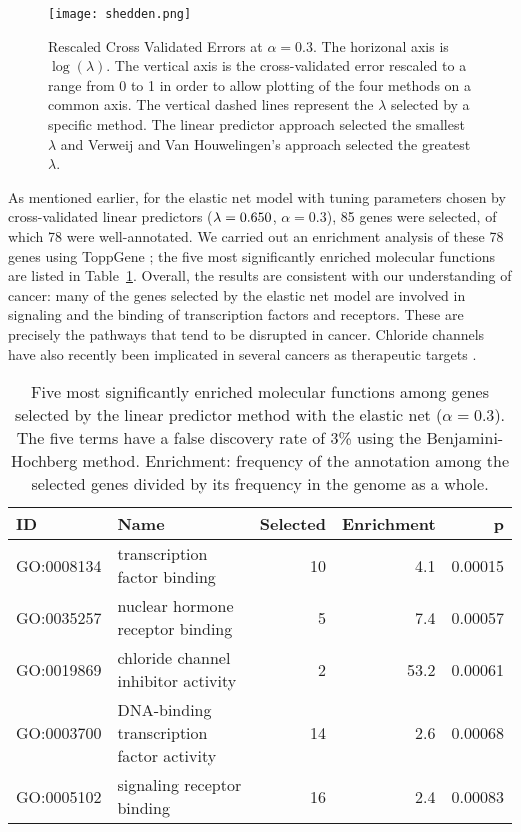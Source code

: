 \begin{figure}[!htb]
  \centering
  \texttt{[image: shedden.png]}
  \caption{\label{fig:CVE}Rescaled Cross Validated Errors at $\alpha = 0.3$. The horizonal axis is $\log(\lambda)$. The vertical axis is the cross-validated error rescaled to a range from 0 to 1 in order to allow plotting of the four methods on a common axis. The vertical dashed lines represent the $\lambda$ selected by a specific method. The linear predictor approach selected the smallest $\lambda$ and Verweij and Van Houwelingen's approach selected the greatest $\lambda$.}
\end{figure}

As mentioned earlier, for the elastic net model with tuning parameters chosen by cross-validated linear predictors ($\lambda = 0.650$, $\alpha = 0.3$), 85 genes were selected, of which 78 were well-annotated.  We carried out an enrichment analysis of these 78 genes using ToppGene \citep{Chen2009c}; the five most significantly enriched molecular functions are listed in Table~\ref{Tab:go}.  Overall, the results are consistent with our understanding of cancer: many of the genes selected by the elastic net model are involved in signaling and the binding of transcription factors and receptors.  These are precisely the pathways that tend to be disrupted in cancer.  Chloride channels have also recently been implicated in several cancers as therapeutic targets \citep{Peretti2015}.

\begin{table}[ht]
\centering
\caption{\label{Tab:go} Five most significantly enriched molecular functions among genes selected by the linear predictor method with the elastic net ($\alpha=0.3$).  The five terms have a false discovery rate of 3\% using the Benjamini-Hochberg method. Enrichment: frequency of the annotation among the selected genes divided by its frequency in the genome as a whole.}
\begin{tabular}{llrrr}
\toprule
ID & Name & Selected & Enrichment & p \\
\midrule
GO:0008134 & transcription factor binding & 10 & 4.1 & 0.00015 \\
GO:0035257 & nuclear hormone receptor binding & 5 & 7.4 & 0.00057 \\
GO:0019869 & chloride channel inhibitor activity & 2 & 53.2 & 0.00061 \\
GO:0003700 & DNA-binding transcription factor activity & 14 & 2.6 & 0.00068 \\
GO:0005102 & signaling receptor binding & 16 & 2.4 & 0.00083 \\
\bottomrule
\end{tabular}
\end{table}

